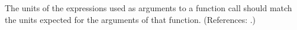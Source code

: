 The units of the expressions used as arguments to a function call
should match the units expected for the arguments of that function.
(References: .)
